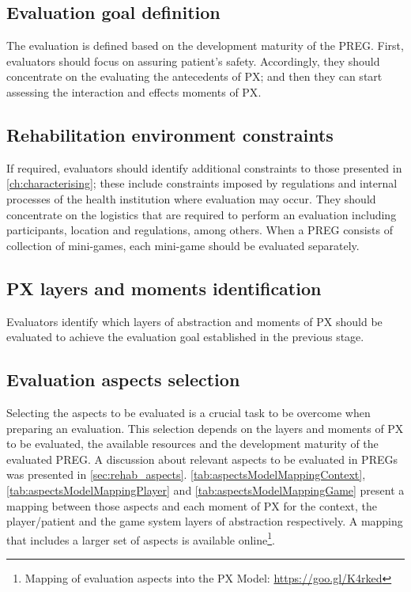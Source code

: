 \subsection{Evaluation goal definition}
The evaluation is defined based on the development maturity of the \ac{PREG}. First, evaluators should focus on assuring patient’s safety. Accordingly, they should concentrate on the evaluating the antecedents of \ac{PX}; and then they can start assessing the interaction and effects moments of \ac{PX}.

\subsection{Rehabilitation environment constraints}
If required, evaluators should identify additional constraints to those presented in \autoref{ch:characterising}; these include constraints imposed by regulations and internal processes of the health institution where evaluation may occur. They should concentrate on the logistics that are required to perform an evaluation including participants, location and regulations, among others. When a \ac{PREG} consists of collection of mini-games, each mini-game should be evaluated separately.

\subsection{\ac{PX} layers and moments identification}
Evaluators identify which layers of abstraction and moments of \ac{PX} should be evaluated to achieve the evaluation goal established in the previous stage.

\subsection{Evaluation aspects selection}
Selecting the aspects to be evaluated is a crucial task to be overcome when preparing an evaluation. This selection depends on the layers and moments of \ac{PX} to be evaluated, the available resources and the development maturity of the evaluated \ac{PREG}. A discussion about relevant aspects to be evaluated in \acp{PREG} was presented in \autoref{sec:rehab_aspects}. \autoref{tab:aspectsModelMappingContext}, \autoref{tab:aspectsModelMappingPlayer} and \autoref{tab:aspectsModelMappingGame} present a mapping between those aspects and each moment of \ac{PX} for the context, the player/patient and the game system layers of abstraction respectively. A mapping that includes a larger set of aspects is available online\footnote{Mapping of evaluation aspects into the \ac{PX} Model: \url{https://goo.gl/K4rked}}.

